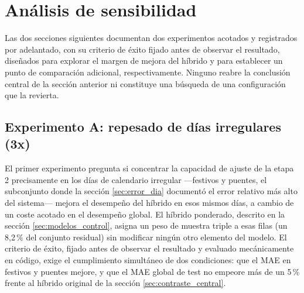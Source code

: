 \section{Análisis de sensibilidad}\label{sec:analisis_sensibilidad}

Las dos secciones siguientes documentan dos experimentos acotados y registrados por
adelantado, con su criterio de éxito fijado antes de observar el resultado, diseñados para
explorar el margen de mejora del híbrido y para establecer un punto de comparación
adicional, respectivamente. Ninguno reabre la conclusión central de la sección anterior ni
constituye una búsqueda de una configuración que la revierta.

\subsection{Experimento A: repesado de días irregulares (3x)}\label{sec:experimento_a}

El primer experimento pregunta si concentrar la capacidad de ajuste de la etapa 2
precisamente en los días de calendario irregular —festivos y puentes, el subconjunto donde
la sección \ref{sec:error_dia} documentó el error relativo más alto del sistema— mejora el
desempeño del híbrido en esos mismos días, a cambio de un coste acotado en el desempeño
global. El híbrido ponderado, descrito en la sección \ref{sec:modelos_control}, asigna un
peso de muestra triple a esas filas (un 8,2\,\% del conjunto residual) sin modificar
ningún otro elemento del modelo. El criterio
de éxito, fijado antes de observar el resultado y evaluado mecánicamente en código, exige
el cumplimiento simultáneo de dos condiciones: que el MAE en festivos y puentes mejore, y
que el MAE global de test no empeore más de un 5\,\% frente al híbrido original de la
sección \ref{sec:contraste_central}.

\begin{table}[htbp]
  \centering
  \setlength{\tabcolsep}{4pt}
  \resizebox{\textwidth}{!}{}
  \caption{}
  \label{tab:criterio_experimento_a}
\end{table}

